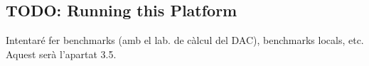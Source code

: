 
\subsection{TODO: Running this Platform}

Intentaré fer benchmarks (amb el lab. de càlcul del DAC), benchmarks locals,
etc. Aquest serà l'apartat 3.5.
